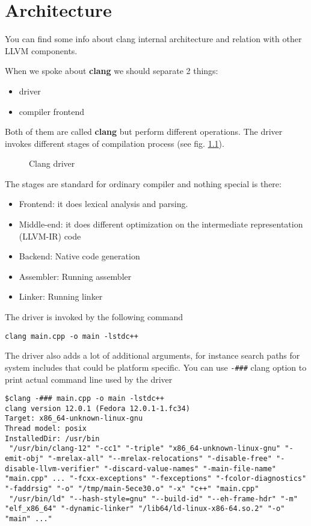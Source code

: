 \chapter{Architecture}

You can find some info about clang internal architecture and relation
with other LLVM components.

When we spoke about \textbf{clang} we should separate 2 things:
\begin{itemize}
\item driver
\item compiler frontend 
\end{itemize}
Both of them are called \textbf{clang} but perform different
operations. The driver invokes different stages of compilation process
(see fig. \ref{fig:clang_driver}). 
\begin{figure}
\begin{center}
\end{center}
  \caption{Clang driver}
  \label{fig:clang_driver}
\end{figure}
The stages are standard for ordinary compiler and nothing special is
there:
\begin{itemize}
\item Frontend: it does lexical analysis and parsing.
\item Middle-end: it does different optimization on the intermediate
  representation (LLVM-IR) code
\item Backend: Native code generation
\item Assembler: Running assembler
\item Linker: Running linker
\end{itemize}

The driver is invoked by the following command
\begin{verbatim}
clang main.cpp -o main -lstdc++
\end{verbatim}
The driver also adds a lot of additional arguments, for instance
search paths for system includes that could be platform specific.
You can use \texttt{-###} clang option to print actual
command line used by the driver
\begin{verbatim}
$clang -### main.cpp -o main -lstdc++
clang version 12.0.1 (Fedora 12.0.1-1.fc34)
Target: x86_64-unknown-linux-gnu
Thread model: posix
InstalledDir: /usr/bin
 "/usr/bin/clang-12" "-cc1" "-triple" "x86_64-unknown-linux-gnu" "-emit-obj" "-mrelax-all" "--mrelax-relocations" "-disable-free" "-disable-llvm-verifier" "-discard-value-names" "-main-file-name" "main.cpp" ... "-fcxx-exceptions" "-fexceptions" "-fcolor-diagnostics" "-faddrsig" "-o" "/tmp/main-5ece30.o" "-x" "c++" "main.cpp"
 "/usr/bin/ld" "--hash-style=gnu" "--build-id" "--eh-frame-hdr" "-m" "elf_x86_64" "-dynamic-linker" "/lib64/ld-linux-x86-64.so.2" "-o" "main" ..."
\end{verbatim}
